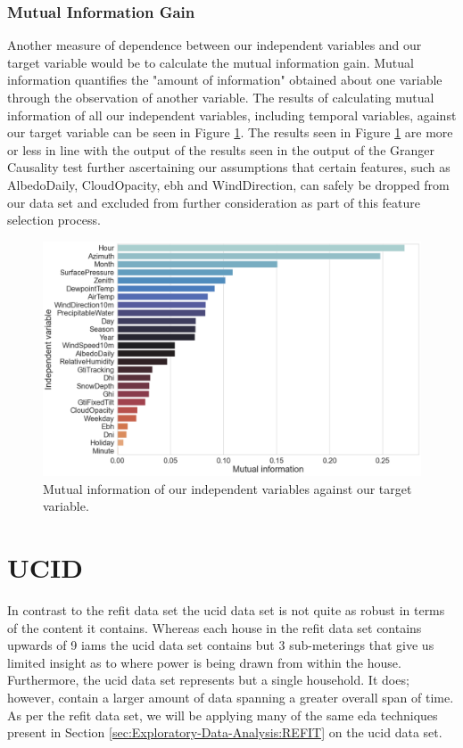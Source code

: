 \subsubsection{Mutual Information Gain}
\label{subsubsec:Exploratory-Data-Analysis:REFIT:Causality-and-Correlation:Mutual-Information-Gain}
Another measure of dependence between our independent variables and our target variable would be to calculate the mutual information gain. Mutual information quantifies the "amount of information" obtained about one variable through the observation of another variable. The results of calculating mutual information of all our independent variables, including temporal variables, against our target variable can be seen in Figure \ref{fig:REFIT-House-12-Mutual-Information-Gain}. The results seen in Figure \ref{fig:REFIT-House-12-Mutual-Information-Gain} are more or less in line with the output of the results seen in the output of the Granger Causality test further ascertaining our assumptions that certain features, such as AlbedoDaily, CloudOpacity, \gls{ebh} and WindDirection, can safely be dropped from our data set and excluded from further consideration as part of this feature selection process.

\begin{figure}[H]
    \centering
    \includegraphics[width=\textwidth]{Images/Chapter 5/REFIT/REFIT-House-12-Mutual-Information-2.pdf}
    \caption{Mutual information of our independent variables against our target variable.}
    \label{fig:REFIT-House-12-Mutual-Information-Gain}
\end{figure}

\section{UCID}
\label{sec:Exploratory-Data-Analysis:UCID}
In contrast to the \gls{refit} data set the \gls{ucid} data set is not quite as robust in terms of the content it contains. Whereas each house in the \gls{refit} data set contains upwards of 9 \glspl{iam} the \gls{ucid} data set contains but 3 sub-meterings that give us limited insight as to where power is being drawn from within the house. Furthermore, the \gls{ucid} data set represents but a single household. It does; however, contain a larger amount of data spanning a greater overall span of time. As per the \gls{refit} data set, we will be applying many of the same \gls{eda} techniques present in Section \ref{sec:Exploratory-Data-Analysis:REFIT} on the \gls{ucid} data set.


